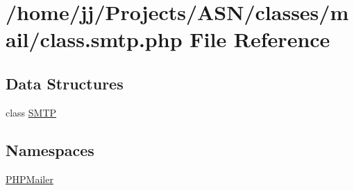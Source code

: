 \hypertarget{class_8smtp_8php}{}\section{/home/jj/\+Projects/\+A\+S\+N/classes/mail/class.smtp.\+php File Reference}
\label{class_8smtp_8php}
\subsection*{Data Structures}
\begin{DoxyCompactItemize}
\item 
class \hyperlink{class_s_m_t_p}{S\+M\+TP}
\end{DoxyCompactItemize}
\subsection*{Namespaces}
\begin{DoxyCompactItemize}
\item 
 \hyperlink{namespace_p_h_p_mailer}{P\+H\+P\+Mailer}
\end{DoxyCompactItemize}
